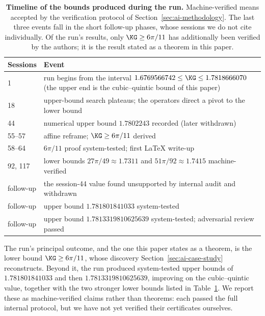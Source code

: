\begin{table}[t]
\centering
\small
\begin{tabular}{@{}lp{}@{}}
\toprule
Sessions & Event\\
\midrule
1 & run begins from the interval $1.6769566742\le\KG\le1.7818666070$
(the upper end is the cubic--quintic bound of this paper)\\
18 & upper-bound search plateaus; the operators direct a pivot to the
lower bound\\
44 & numerical upper bound $1.7802243$ recorded (later withdrawn)\\
55--57 & affine reframe; $\KG\ge6\pi/11$ derived\\
58--64 & $6\pi/11$ proof system-tested; first \LaTeX{} write-up\\
92, 117 & lower bounds $27\pi/49\approx1.7311$ and
$51\pi/92\approx1.7415$ machine-verified\\
follow-up & the session-44 value found unsupported by internal audit and
withdrawn\\
follow-up & upper bound $1.781801841033$ system-tested\\
follow-up & upper bound $1.7813319810625639$ system-tested;
adversarial review passed\\
\bottomrule
\end{tabular}
\caption{\textbf{Timeline of the bounds produced during the run.}
Machine-verified means accepted by the verification protocol of
Section~\ref{sec:ai-methodology}. The last three events fall in the short
follow-up phases, whose sessions we do not cite individually. Of the
run's results, only $\KG\ge6\pi/11$ has additionally been verified by the
authors; it is the result stated as a theorem in this paper.}
\label{tab:timeline}
\end{table}

The run's principal outcome, and the one this paper states as a theorem,
is the lower bound $\KG\ge6\pi/11$, whose discovery
Section~\ref{sec:ai-case-study} reconstructs. Beyond it, the run produced
system-tested upper bounds of $1.781801841033$ and then
$1.7813319810625639$, improving on the cubic--quintic value, together with
the two stronger lower bounds listed in Table~\ref{tab:timeline}. We
report these as machine-verified claims rather than theorems: each passed
the full internal protocol, but we have not yet verified their
certificates ourselves.

